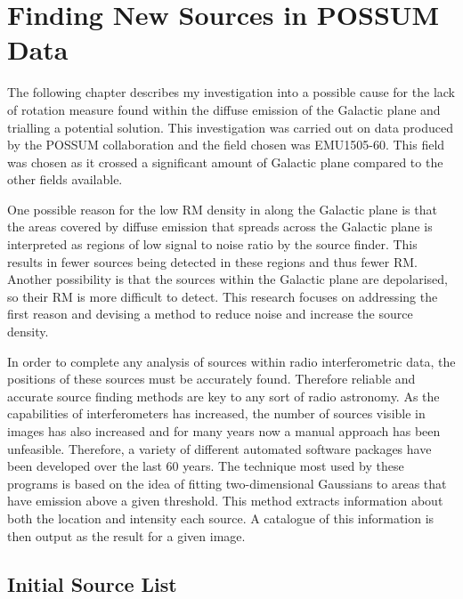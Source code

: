 \chapter{Finding New Sources in POSSUM Data}
\label{ch: sourcefinding}

The following chapter describes my investigation into a possible cause for the lack of rotation measure found within the diffuse emission of the Galactic plane and trialling a potential solution. This investigation was carried out on data produced by the POSSUM collaboration and the field chosen was EMU1505-60. This field was chosen as it crossed a significant amount of Galactic plane compared to the other fields available.

One possible reason for the low RM density in along the Galactic plane is that the areas covered by diffuse emission that spreads across the Galactic plane is interpreted as regions of low signal to noise ratio by the source finder. This results in fewer sources being detected in these regions and thus fewer RM. Another possibility is that the sources within the Galactic plane are depolarised, so their RM is more difficult to detect. This research focuses on addressing the first reason and devising a method to reduce noise and increase the source density.




In order to complete any analysis of sources within radio interferometric data, the positions of these sources must be accurately found. Therefore reliable and accurate source finding methods are key to any sort of radio astronomy. As the capabilities of interferometers has  increased, the number of sources visible in images has also increased and for many years now a manual approach has been unfeasible. Therefore, a variety of different automated software packages have been developed over the last 60 years. The technique most used by these programs is based on the idea of fitting two-dimensional Gaussians to areas that have emission above a given threshold. This method extracts information about both the location and intensity each source. A catalogue of this information is then output as the result for a given image.

\section{Initial Source List}

